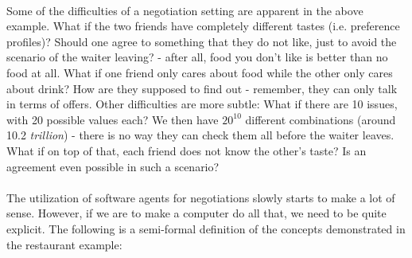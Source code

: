 \documentclass[12pt]{article}
\numberwithin{equation}{section}
\begin{document}
			\paragraph*{}
				Some of the difficulties of a negotiation setting are apparent in the above example. What if the two friends have completely different tastes (i.e. preference profiles)? Should one agree to something that they do not like, just to avoid the scenario of the waiter leaving? - after all, food you don't like is better than no food at all. What if one friend only cares about food while the other only cares about drink? How are they supposed to find out - remember, they can only talk in terms of offers.
				Other difficulties are more subtle: What if there are 10 issues, with 20 possible values each? We then have $20^{10}$ different combinations (around 10.2 \emph{trillion}) - there is no way they can check them all before the waiter leaves. What if on top of that, each friend does not know the other's taste? Is an agreement even possible in such a scenario?

			\paragraph*{}
				The utilization of software agents for negotiations slowly starts to make a lot of sense. However, if we are to make a computer do all that, we need to be quite explicit. The following is a semi-formal definition of the concepts demonstrated in the restaurant example:

				\quad
				
\end{document}
